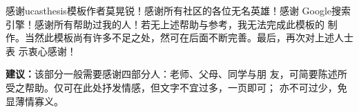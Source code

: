 \begin{acknowledgement}
    感谢ucasthesis模板作者莫晃锐！感谢所有社区的各位无名英雄！感谢
    Google搜索引擎！感谢所有帮助过我的人！若无上述帮助与参考，我无法完成此模板的
    制作。当然此模板尚有许多不足之处，然可在后面不断完善。最后，再次对上述人士表
    示衷心感谢！
    
    \begin{leftbar}
        \noindent\textbf{建议：}该部分一般需要感谢四部分人：老师、父母、同学与朋
        友，可简要陈述所受之帮助。仅可在此处抒发情感，但文字不宜过多，一页即可；
        亦不可过少，免显薄情寡义。
    \end{leftbar}
\end{acknowledgement}